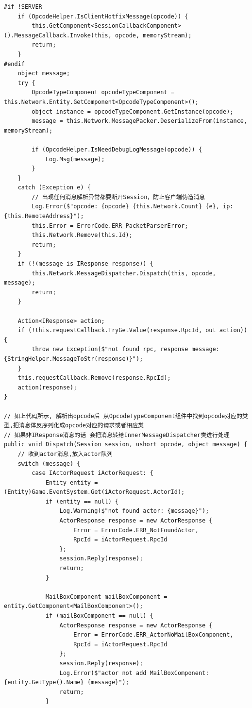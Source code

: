 \documentclass[9pt, b5paper]{article}
\begin{document}
\begin{verbatim}
#if !SERVER
    if (OpcodeHelper.IsClientHotfixMessage(opcode)) {
        this.GetComponent<SessionCallbackComponent>().MessageCallback.Invoke(this, opcode, memoryStream);
        return;
    }
#endif
    object message;
    try {
        OpcodeTypeComponent opcodeTypeComponent = this.Network.Entity.GetComponent<OpcodeTypeComponent>();
        object instance = opcodeTypeComponent.GetInstance(opcode);
        message = this.Network.MessagePacker.DeserializeFrom(instance, memoryStream);
                
        if (OpcodeHelper.IsNeedDebugLogMessage(opcode)) {
            Log.Msg(message);
        }
    }
    catch (Exception e) {
        // 出现任何消息解析异常都要断开Session，防止客户端伪造消息
        Log.Error($"opcode: {opcode} {this.Network.Count} {e}, ip: {this.RemoteAddress}");
        this.Error = ErrorCode.ERR_PacketParserError;
        this.Network.Remove(this.Id);
        return;
    }
    if (!(message is IResponse response)) {
        this.Network.MessageDispatcher.Dispatch(this, opcode, message);
        return;
    }
            
    Action<IResponse> action;
    if (!this.requestCallback.TryGetValue(response.RpcId, out action)) {
        throw new Exception($"not found rpc, response message: {StringHelper.MessageToStr(response)}");
    }
    this.requestCallback.Remove(response.RpcId);
    action(response);
}

// 如上代码所示, 解析出opcode后 从OpcodeTypeComponent组件中找到opcode对应的类型,把消息体反序列化成opcode对应的请求或者相应类
// 如果非IResponse消息的话 会把消息转给InnerMessageDispatcher类进行处理
public void Dispatch(Session session, ushort opcode, object message) {
    // 收到actor消息,放入actor队列
    switch (message) {
        case IActorRequest iActorRequest: {
            Entity entity = (Entity)Game.EventSystem.Get(iActorRequest.ActorId);
            if (entity == null) {
                Log.Warning($"not found actor: {message}");
                ActorResponse response = new ActorResponse {
                    Error = ErrorCode.ERR_NotFoundActor,
                    RpcId = iActorRequest.RpcId
                };
                session.Reply(response);
                return;
            }

            MailBoxComponent mailBoxComponent = entity.GetComponent<MailBoxComponent>();
            if (mailBoxComponent == null) {
                ActorResponse response = new ActorResponse {
                    Error = ErrorCode.ERR_ActorNoMailBoxComponent,
                    RpcId = iActorRequest.RpcId
                };
                session.Reply(response);
                Log.Error($"actor not add MailBoxComponent: {entity.GetType().Name} {message}");
                return;
            }


\end{verbatim}
\end{document}
